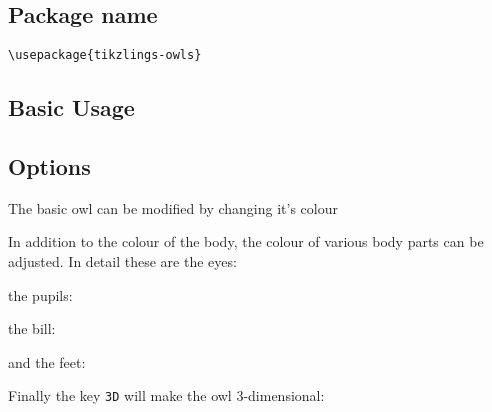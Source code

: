 \documentclass[parskip=half]{scrartcl}
\begin{document}
\subsection{Package name}

\begin{tcolorbox}[lower separated=false, lefthand width=.8\linewidth]
\vspace*{0.5cm}
\lstinline|\usepackage{tikzlings-owls}|
\vspace*{0.5cm}
\end{tcolorbox}

\subsection{Basic Usage}

\begin{tcblisting}{}
\owl
\end{tcblisting}

\subsection{Options}

The basic owl can be modified by changing it's colour

\begin{tcblisting}{}
\owl[body=SteelBlue]
\end{tcblisting}

In addition to the colour of the body, the colour of various body parts can be adjusted. In detail these are the eyes:

\begin{tcblisting}{}
\owl[eye=red]
\end{tcblisting}

the pupils:

\begin{tcblisting}{}
\owl[pupil=red]
\end{tcblisting}

the bill:

\begin{tcblisting}{}
\owl[bill=red]
\end{tcblisting}

and the feet:

\begin{tcblisting}{}
\owl[feet=red]
\end{tcblisting}

Finally the key \lstinline|3D| will make the owl 3-dimensional:

\begin{tcblisting}{}
\owl[3D]
\end{tcblisting}
\end{document}

